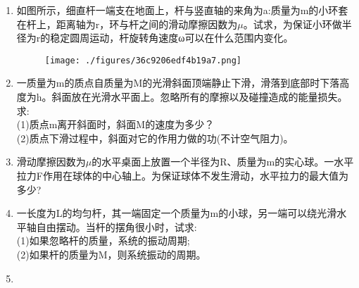 \begin{enumerate}
\item 如图所示，细直杆一端支在地面上，杆与竖直轴的来角为a:质量为m的小环套在杆上，距离轴为r，环与杆之间的滑动摩擦因数为$\mu$。试求，为保证小环做半径为r的稳定圆周运动，杆旋转角速度ω可以在什么范围内变化。
\begin{figure}[ht]
\centering
\texttt{[image: ./figures/36c9206edf4b19a7.png]}
\caption{} \label{fig_SSD11_1}
\end{figure}
\item 一质量为m的质点自质量为M的光滑斜面顶端静止下滑，滑落到底部时下落高度为h。斜面放在光滑水平面上。忽略所有的摩擦以及碰撞造成的能量损失。求:\\
(1)质点m离开斜面时，斜面M的速度为多少？\\
(2)质点下滑过程中，斜面对它的作用力做的功(不计空气阻力)。
\item 滑动摩擦因数为$\mu$的水平桌面上放置一个半径为R、质量为m的实心球。一水平拉力F作用在球体的中心轴上。为保证球体不发生滑动，水平拉力的最大值为多少?
\item 一长度为L的均匀杆，其一端固定一个质量为m的小球，另一端可以绕光滑水平轴自由摆动。当杆的摆角很小时，试求:\\
(1)如果忽略杆的质量，系统的振动周期;\\
(2)如果杆的质量为M，则系统振动的周期。
\item 
\end{enumerate}
